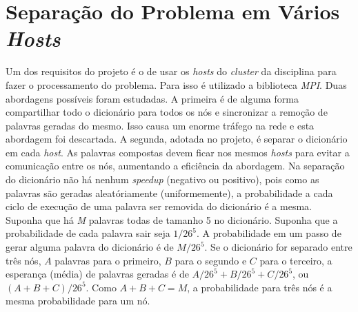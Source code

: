 \documentclass[a4paper]{article}
\begin{document}
\section{Separação do Problema em Vários \emph{Hosts}}
\indent \indent  Um dos requisitos do projeto é o de usar os \emph{hosts} do \emph{cluster} da disciplina para fazer o processamento do problema. Para isso é utilizado a biblioteca \emph{MPI}. Duas abordagens possíveis foram estudadas. A primeira é de alguma forma compartilhar todo o dicionário para todos os nós e sincronizar a remoção de palavras geradas do mesmo. Isso causa um enorme tráfego na rede e esta abordagem foi descartada. A segunda, adotada no projeto, é separar o dicionário em cada \emph{host}. As palavras compostas devem ficar nos mesmos \emph{hosts} para evitar a comunicação entre os nós, aumentando a eficiência da abordagem. Na separação do dicionário não há nenhum \emph{speedup} (negativo ou positivo), pois como as palavras são geradas aleatóriamente (uniformemente), a probabilidade a cada ciclo de execução de uma palavra ser removida do dicionário é a mesma.\\
\indent Suponha que há \emph{M} palavras todas de tamanho 5 no dicionário. Suponha que a probabilidade de cada palavra sair seja \begin{math}1/26^5\end{math}. A probabilidade em um passo de gerar alguma palavra do dicionário é de \begin{math}M/26^5\end{math}. Se o dicionário for separado entre três nós, \begin{math}A\end{math} palavras para o primeiro, \begin{math}B\end{math} para o segundo e \begin{math}C\end{math} para o terceiro, a esperança (média) de palavras geradas é de \begin{math}A/26^5 + B/26^5 + C/26^5\end{math}, ou \begin{math}(A+B+C)/26^5\end{math}. Como \begin{math}A+B+C = M\end{math}, a probabilidade para três nós é a mesma probabilidade para um nó.\\
\end{document}
